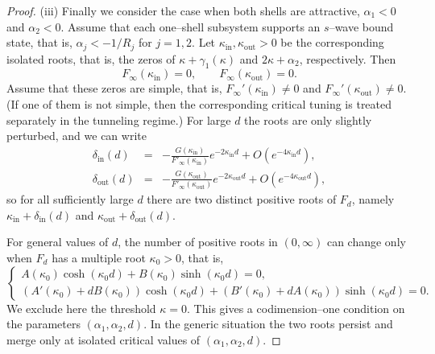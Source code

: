 \documentclass[10pt,a4paper]{amsart}
\begin{document}
\begin{proof}
\smallskip
\noindent
(iii) Finally we consider the case when both shells are attractive,
$\alpha_1<0$ and $\alpha_2<0$.
Assume that each one--shell subsystem supports an $s$--wave bound state, that is,
$\alpha_j<-1/R_j$ for $j=1,2$.
Let $\kappa_{\mathrm{in}},\kappa_{\mathrm{out}}>0$ be the corresponding isolated
roots, that is, the zeros of $\kappa+\gamma_1(\kappa)$ and $2\kappa+\alpha_2$,
respectively.
Then
$$
F_\infty(\kappa_{\mathrm{in}})=0,\qquad F_\infty(\kappa_{\mathrm{out}})=0.
$$
Assume that these zeros are simple, that is,
$F_\infty'(\kappa_{\mathrm{in}})\ne0$ and $F_\infty'(\kappa_{\mathrm{out}})\ne0$.
(If one of them is not simple, then the corresponding critical tuning is treated
separately in the tunneling regime.)
For large $d$ the roots are only slightly perturbed, and we can write
\begin{eqnarray}
\delta_{\mathrm{in}}(d)&=&-\frac{G(\kappa_{\mathrm{in}})}{F'_\infty(\kappa_{\mathrm{in}})}e^{-2\kappa_{\mathrm{in}}d}
+O(e^{-4\kappa_{\mathrm{in}}d}),\nonumber\\
\delta_{\mathrm{out}}(d)&=&-\frac{G(\kappa_{\mathrm{out}})}{F'_\infty(\kappa_{\mathrm{out}})}e^{-2\kappa_{\mathrm{out}}d}
+O(e^{-4\kappa_{\mathrm{out}}d}),\nonumber
\end{eqnarray}
so for all sufficiently large $d$ there are two distinct positive roots of $F_d$,
namely $\kappa_{\mathrm{in}}+\delta_{\mathrm{in}}(d)$ and
$\kappa_{\mathrm{out}}+\delta_{\mathrm{out}}(d)$.

For general values of $d$, the number of positive roots in $(0,\infty)$ can
change only when $F_d$ has a multiple root $\kappa_0>0$, that is,
\begin{equation}\label{eq:double-root-new}
\begin{cases}
A(\kappa_0)\cosh(\kappa_0d)+B(\kappa_0)\sinh(\kappa_0d)=0,\\
(A'(\kappa_0)+dB(\kappa_0))\cosh(\kappa_0d)
+(B'(\kappa_0)+dA(\kappa_0))\sinh(\kappa_0d)=0.
\end{cases}
\end{equation}
We exclude here the threshold $\kappa=0$.
This gives a codimension--one condition on the parameters $(\alpha_1,\alpha_2,d)$.
In the generic situation the two roots persist and merge only at isolated
critical values of $(\alpha_1,\alpha_2,d)$.
\end{proof}
\end{document}
